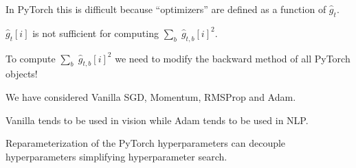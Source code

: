 {

In PyTorch this is difficult because ``optimizers'' are defined as a function of $\hat{g}_t$.

\vfill
$\hat{g}_t[i]$ is not sufficient for computing $\sum_b \;\hat{g}_{t,b}[i]^2$.


\vfill
To compute $\sum_b \;\hat{g}_{t,b}[i]^2$ we need to modify the backward method of all PyTorch objects!


We have considered Vanilla SGD, Momentum, RMSProp and Adam.

\vfill
Vanilla tends to be used in vision while Adam tends to be used in NLP.

\vfill
Reparameterization of the PyTorch hyperparameters can decouple hyperparameters simplifying hyperparameter search.



} 

